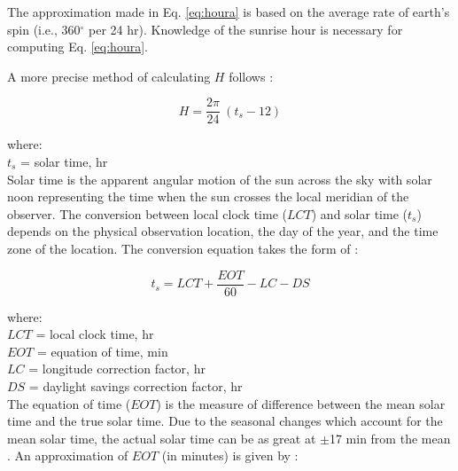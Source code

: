 The approximation made in Eq. \ref{eq:houra} is based on the average rate of earth's spin (i.e., 360$^{\circ}$ per 24 hr). 
Knowledge of the sunrise hour is necessary for computing Eq. \ref{eq:houra}.

A more precise method of calculating $H$ follows \parencite[Eq. 3.1]{stine01}:

\begin{equation}
\label{eq:hour}
    H = \frac{2\pi}{24} \: (t_{s} - 12)
\end{equation}

\noindent where: \\
\indent $t_{s}$ = solar time, hr \\

\noindent Solar time is the apparent angular motion of the sun across the sky with solar noon representing the time when the sun crosses the local meridian of the observer. 
The conversion between local clock time ($LCT$) and solar time ($t_{s}$) depends on the physical observation location, the day of the year, and the time zone of the location.  
The conversion equation takes the form of \parencite[Eq. 3.5]{stine01}:

%
\begin{equation}
\label{eq:soltime}
    t_{s} = LCT + \frac{EOT}{60} - LC - DS
\end{equation}

\noindent where: \\
\indent $LCT$ = local clock time, hr \\
\indent $EOT$ = equation of time, min \\
\indent $LC$ = longitude correction factor, hr \\
\indent $DS$  = daylight savings correction factor, hr\\

\noindent The equation of time ($EOT$) is the measure of difference between the mean solar time and the true solar time.  
Due to the seasonal changes which account for the mean solar time, the actual solar time can be as great at $\pm$17 min from the mean \parencite{stine01}.  
An approximation of $EOT$ (in minutes) is given by \parencite[Eq. 1.6]{woolf68}:

